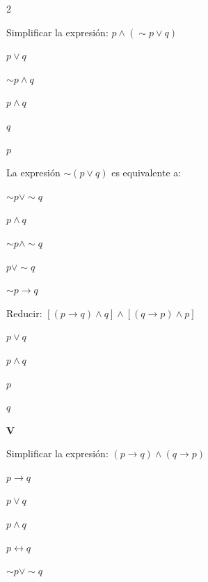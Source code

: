 \begin{tcolorbox}[
  enhanced, colback=AzulClaro!40, colframe=AzulMedio,
  arc=2pt, boxrule=0.5pt, fonttitle=\sffamily\bfseries\small,
  title={Nivel Intermedio}, left=4pt, right=4pt, top=3pt, bottom=3pt
]\end{tcolorbox}

\begin{multicols}{2}

\ejercicio Simplificar la expresión:
$p \wedge (\sim p \vee q)$
\begin{alternativas}
  \item $p \vee q$
  \item $\sim p \wedge q$
  \item $p \wedge q$
  \item $q$
  \item $p$
\end{alternativas}
\vspace{0.3cm}

\ejercicio La expresión $\sim(p \vee q)$ es equivalente a:
\begin{alternativas}
  \item $\sim p \vee \sim q$
  \item $p \wedge q$
  \item $\sim p \wedge \sim q$
  \item $p \vee \sim q$
  \item $\sim p \rightarrow q$
\end{alternativas}
\vspace{0.3cm}

\ejercicio Reducir: $[(p \rightarrow q) \wedge q] \wedge [(q \rightarrow p) \wedge p]$
\begin{alternativas}
  \item $p \vee q$
  \item $p \wedge q$
  \item $p$
  \item $q$
  \item $\mathbf{V}$
\end{alternativas}
\vspace{0.3cm}

\ejercicio Simplificar la expresión:
$(p \rightarrow q) \wedge (q \rightarrow p)$
\begin{alternativas}
  \item $p \rightarrow q$
  \item $p \vee q$
  \item $p \wedge q$
  \item $p \leftrightarrow q$
  \item $\sim p \vee \sim q$
\end{alternativas}
\vspace{0.3cm}


\end{multicols}
